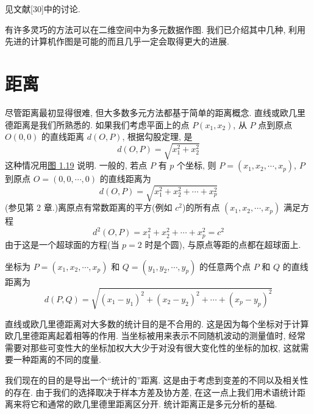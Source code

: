 见文献[30]中的讨论.

有许多灵巧的方法可以在二维空间中为多元数据作图. 我们已介绍其中几种, 利用先进的计算机作图是可能的而且几乎一定会取得更大的进展.

\section{距离}  %
\label{sec:1.5}

尽管距离最初显得很难, 但大多数多元方法都基于简单的距离概念. 直线或欧几里德距离是我们所熟悉的. 如果我们考虑平面上的点 $P(x_1, x_2)$, 从 $P$ 点到原点 $O(0,0)$ 的直线距离 $d(O, P)$, 根据勾股定理, 是
\label{eq:1-9}
\begin{equation}
d(O, P) = \sqrt{x_1^2 + x_2^2} \tag{1-9}
\end{equation}
这种情况用\hyperref[fig:1.19]{图 1.19} 说明. 一般的, 若点 $P$ 有 $p$ 个坐标, 则 $P = (x_1, x_2, \cdots, x_p)$, $P$ 到原点 $O = (0, 0, \cdots, 0)$ 的直线距离为
\label{eq:1-10}
\begin{equation}
d(O, P) = \sqrt{x_1^2 + x_2^2 + \cdots + x_p^2} \tag{1-10}
\end{equation}
(参见第 2 章.)离原点有常数距离的平方(例如 $c^2$)的所有点 $(x_1, x_2, \cdots, x_p)$ 满足方程
\label{eq:1-11}
\begin{equation}
d^2(O, P) = x_1^2 + x_2^2 + \cdots + x_p^2 = c^2 \tag{1-11}
\end{equation}
由于这是一个超球面的方程(当 $p=2$ 时是个圆), 与原点等距的点都在超球面上.

坐标为 $P = (x_1, x_2, \cdots, x_p)$ 和 $Q = (y_1, y_2, \cdots, y_p)$ 的任意两个点 $P$ 和 $Q$ 的直线距离为
\label{eq:1-12}
\begin{equation}
d(P, Q) = \sqrt{(x_1 - y_1)^2 + (x_2 - y_2)^2 + \cdots + (x_p - y_p)^2} \tag{1-12}
\end{equation}

\begin{mvfigure}
\label{fig:1.19}
\end{mvfigure}

直线或欧几里德距离对大多数的统计目的是不合用的. 这是因为每个坐标对于计算欧几里德距离起着相等的作用. 当坐标被用来表示不同随机波动的测量值时, 经常需要对那些可变性大的坐标加权大大少于对没有很大变化性的坐标的加权, 这就需要一种距离的不同的度量.

我们现在的目的是导出一个“统计的”距离. 这是由于考虑到变差的不同以及相关性的存在. 由于我们的选择取决于样本方差及协方差, 在这一点上我们用术语统计距离来将它和通常的欧几里德里距离区分开. 统计距离正是多元分析的基础.

